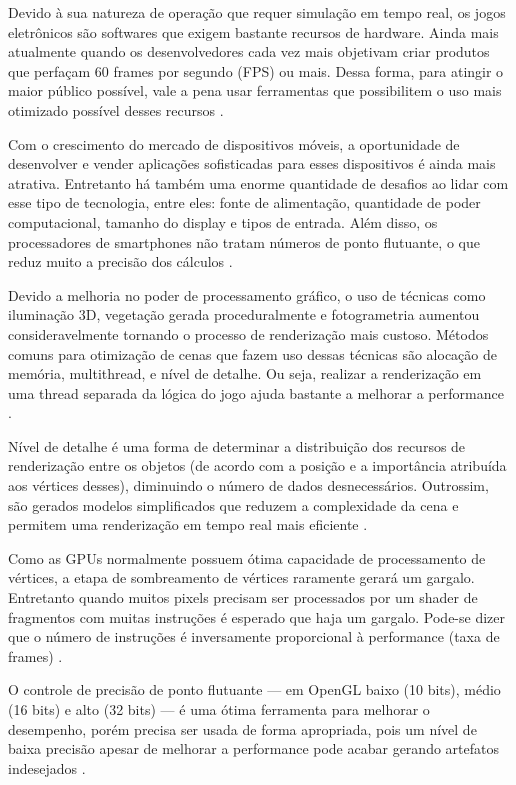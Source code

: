 Devido à sua natureza de operação que requer simulação em tempo real, os jogos eletrônicos são softwares que exigem bastante recursos de hardware. Ainda mais atualmente quando os desenvolvedores cada vez mais objetivam criar produtos que perfaçam 60 frames por segundo (FPS) ou mais. Dessa forma, para atingir o maior público possível, vale a pena usar ferramentas que possibilitem o uso mais otimizado possível desses recursos \cite{comparacaoDesempenho}.

Com o crescimento do mercado de dispositivos móveis, a oportunidade de desenvolver e vender aplicações sofisticadas para esses dispositivos é ainda mais atrativa. Entretanto há também uma enorme quantidade de desafios ao lidar com esse tipo de tecnologia, entre eles: fonte de alimentação, quantidade de poder computacional, tamanho do display e tipos de entrada. Além disso, os processadores de smartphones não tratam números de ponto flutuante, o que reduz muito a precisão dos cálculos \cite{optimizationMobile}.

Devido a melhoria no poder de processamento gráfico, o uso de técnicas como iluminação 3D, vegetação gerada proceduralmente e fotogrametria aumentou consideravelmente tornando o processo de renderização mais custoso. Métodos comuns para otimização de cenas que fazem uso dessas técnicas são alocação de memória, \Gls{multithread}, e nível de detalhe. Ou seja, realizar a renderização em uma thread separada da lógica do jogo ajuda bastante a melhorar a performance \cite{zhang2017vegetation}.

Nível de detalhe é uma forma de determinar a distribuição dos recursos de renderização entre os objetos (de acordo com a posição e a importância atribuída aos vértices desses), diminuindo o número de dados desnecessários. Outrossim, são gerados modelos simplificados que reduzem a complexidade da cena e permitem uma renderização em tempo real mais eficiente \cite{zhang2017vegetation}.

Como as GPUs normalmente possuem ótima capacidade de processamento de vértices, a etapa de sombreamento de vértices raramente gerará um gargalo. Entretanto quando muitos pixels precisam ser processados por um shader de fragmentos com muitas instruções é esperado que haja um gargalo. Pode-se dizer que o número de instruções é inversamente proporcional à performance (taxa de frames) \cite{optimizationMobile}.



O controle de precisão de ponto flutuante --- em OpenGL baixo (10 bits), médio (16 bits) e alto (32 bits) --- é uma ótima ferramenta para melhorar o desempenho, porém precisa ser usada de forma apropriada, pois um nível de baixa precisão apesar de melhorar a performance pode acabar gerando artefatos indesejados \cite{optimizationMobile}.

